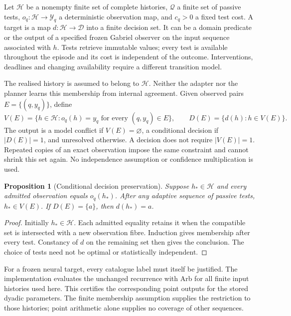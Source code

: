 \documentclass[11pt,a4paper]{article}
\newtheorem{proposition}[theorem]{Proposition}
\theoremstyle{definition}\newtheorem{definition}[theorem]{Definition}
\begin{document}
Let $\mathcal H$ be a nonempty finite set of complete histories, $\mathcal Q$ a finite set of passive tests, $o_q:\mathcal H\to\mathcal Y_q$ a deterministic observation map, and $c_q>0$ a fixed test cost. A target is a map $d:\mathcal H\to\mathcal D$ into a finite decision set. It can be a domain predicate or the output of a specified frozen Gabriel observer on the input sequence associated with $h$. Tests retrieve immutable values; every test is available throughout the episode and its cost is independent of the outcome. Interventions, deadlines and changing availability require a different transition model.

The realised history is assumed to belong to $\mathcal H$. Neither the adapter nor the planner learns this membership from internal agreement. Given observed pairs $E=\{(q,y_q)\}$, define
\begin{equation}
 V(E)=\{h\in\mathcal H:o_q(h)=y_q\text{ for every }(q,y_q)\in E\},
 \qquad D(E)=\{d(h):h\in V(E)\}. \label{eq:versionspace}
\end{equation}
The output is a model conflict if $V(E)=\varnothing$, a conditional decision if $|D(E)|=1$, and unresolved otherwise. A decision does not require $|V(E)|=1$. Repeated copies of an exact observation impose the same constraint and cannot shrink this set again. No independence assumption or confidence multiplication is used.

\begin{proposition}[Conditional decision preservation]\label{prop:finitepreservation}
Suppose $h_*\in\mathcal H$ and every admitted observation equals $o_q(h_*)$. After any adaptive sequence of passive tests, $h_*\in V(E)$. If $D(E)=\{a\}$, then $d(h_*)=a$.
\end{proposition}
\begin{proof}
Initially $h_*\in\mathcal H$. Each admitted equality retains it when the compatible set is intersected with a new observation fibre. Induction gives membership after every test. Constancy of $d$ on the remaining set then gives the conclusion. The choice of tests need not be optimal or statistically independent.
\end{proof}

For a frozen neural target, every catalogue label must itself be justified. The implementation evaluates the unchanged recurrence with Arb for all finite input histories used here. This certifies the corresponding point outputs for the stored dyadic parameters. The finite membership assumption supplies the restriction to those histories; point arithmetic alone supplies no coverage of other sequences.
\end{document}
